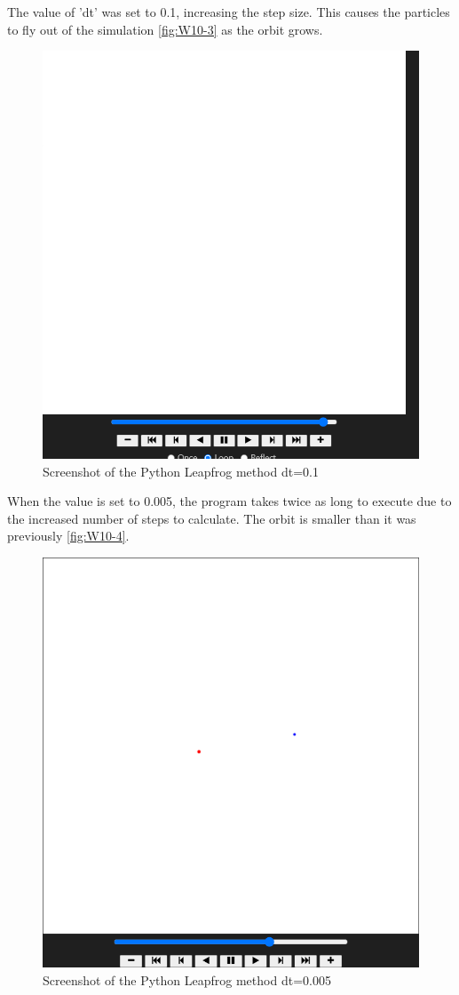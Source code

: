 The value of 'dt' was set to 0.1, increasing the step size. This causes the particles to fly out of the simulation \autoref{fig:W10-3} as the orbit grows.
\begin{figure}[H] 
    \centering
    \includegraphics[width=0.49\columnwidth]{Figures/Week 10/3.png}
    \caption{Screenshot of the Python Leapfrog method dt=0.1}
    \label{fig:W10-3}
\end{figure}

When the value is set to 0.005, the program takes twice as long to execute due to the increased number of steps to calculate. The orbit is smaller than it was previously \autoref{fig:W10-4}.


\begin{figure}[H] 
    \centering
    \includegraphics[width=0.49\columnwidth]{Figures/Week 10/4.png}
    \caption{Screenshot of the Python Leapfrog method dt=0.005}
    \label{fig:W10-4}
\end{figure}

